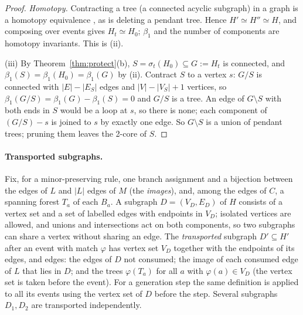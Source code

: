 \documentclass[10pt]{article}
\theoremstyle{definition}
\theoremstyle{plain}
\theoremstyle{remark}
\newcommand{\Betti}{\beta_1}
\begin{document}
\begin{proof}
\emph{Homotopy.} Contracting a tree (a connected acyclic subgraph) in a graph is a homotopy equivalence \citep[Prop.~0.17]{hatcher2002}, as is deleting a pendant tree. Hence $H'\simeq H''\simeq H$, and composing over events gives $H_t\simeq H_0$; $\Betti$ and the number of components are homotopy invariants. This is (ii).

(iii) By Theorem~\ref{thm:protect}(b), $S=\sigma_t(H_0)\subseteq G:=H_t$ is connected, and $\Betti(S)=\Betti(H_0)=\Betti(G)$ by (ii). Contract $S$ to a vertex $s$: $G/S$ is connected with $|E|-|E_S|$ edges and $|V|-|V_S|+1$ vertices, so $\Betti(G/S)=\Betti(G)-\Betti(S)=0$ and $G/S$ is a tree. An edge of $G\setminus S$ with both ends in $S$ would be a loop at $s$, so there is none; each component of $(G/S)-s$ is joined to $s$ by exactly one edge. So $G\setminus S$ is a union of pendant trees; pruning them leaves the 2-core of $S$.
\end{proof}

\paragraph{Transported subgraphs.} Fix, for a minor-preserving rule, one branch assignment and a bijection between the edges of $L$ and $|L|$ edges of $M$ (the \emph{images}), and, among the edges of $C$, a spanning forest $T_a$ of each $B_a$. A subgraph $D=(V_D,E_D)$ of $H$ consists of a vertex set and a set of labelled edges with endpoints in $V_D$; isolated vertices are allowed, and unions and intersections act on both components, so two subgraphs can share a vertex without sharing an edge. The \emph{transported} subgraph $D'\subseteq H'$ after an event with match $\varphi$ has vertex set $V_D$ together with the endpoints of its edges, and edges: the edges of $D$ not consumed; the image of each consumed edge of $L$ that lies in $D$; and the trees $\varphi(T_a)$ for all $a$ with $\varphi(a)\in V_D$ (the vertex set is taken before the event). For a generation step the same definition is applied to all its events using the vertex set of $D$ before the step. Several subgraphs $D_1,D_2$ are transported independently.
\end{document}
